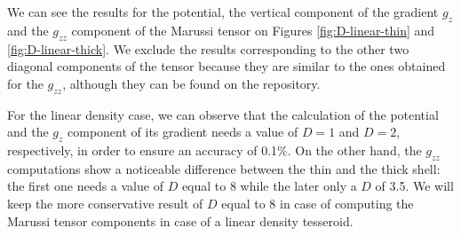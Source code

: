 \documentclass[extra]{gji}
\begin{document}
We can see the results for the potential, the vertical component of the gradient $g_z$ and the $g_{zz}$ component of the Marussi tensor on Figures \ref{fig:D-linear-thin} and \ref{fig:D-linear-thick}.
We exclude the results corresponding to the other two diagonal components of the tensor because they are similar to the ones obtained for the $g_{zz}$, although they can be found on the repository. 

For the linear density case, we can observe that the calculation of the potential and the $g_z$ component of its gradient needs a value of $D=1$ and $D=2$, respectively, in order to ensure an accuracy of 0.1\%.
On the other hand, the $g_{zz}$ computations show a noticeable difference between the thin and the thick shell: the first one needs a value of $D$ equal to 8 while the later only a $D$ of 3.5.
We will keep the more conservative result of $D$ equal to 8 in case of computing the Marussi tensor components in case of a linear density tesseroid.
\end{document}
